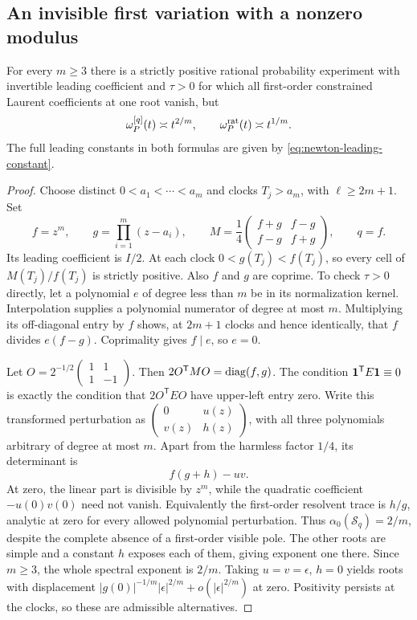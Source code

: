 \subsection{An invisible first variation with a nonzero modulus}
\begin{proposition}\label{prop:quadratic-exposure}
For every $m\ge3$ there is a strictly positive rational probability
experiment with invertible leading coefficient and $\tau>0$ for which
all first-order constrained Laurent coefficients at one root vanish,
but
\[
 \omega_P^{[q]}(t)\asymp t^{2/m},\qquad
 \omega_P^{\rm rat}(t)\asymp t^{1/m}.
\]
The full leading constants in both formulas are given by
\eqref{eq:newton-leading-constant}.
\end{proposition}
\begin{proof}
Choose distinct $0<a_1<\cdots<a_m$ and clocks $T_j>a_m$,
with $\ell\ge2m+1$. Set
\[
 f=z^m,\qquad g=\prod_{i=1}^m(z-a_i),\qquad
 M=\frac14\begin{pmatrix}f+g&f-g\\f-g&f+g\end{pmatrix},
 \qquad q=f.
\]
Its leading coefficient is $I/2$. At each clock $0<g(T_j)<f(T_j)$,
so every cell of $M(T_j)/f(T_j)$ is strictly positive. Also $f$ and
$g$ are coprime. To check $\tau>0$ directly, let a polynomial $e$ of
degree less than $m$ be in its normalization kernel. Interpolation
supplies a polynomial numerator of degree at most $m$. Multiplying
its off-diagonal entry by $f$ shows, at $2m+1$ clocks and hence
identically, that $f$ divides $e(f-g)$. Coprimality gives $f\mid e$,
so $e=0$.

Let $O=2^{-1/2}\left(\begin{smallmatrix}1&1\\1&-1\end{smallmatrix}\right)$.
Then $2O^{\mathsf T}MO=\operatorname{diag}(f,g)$. The condition
$\mathbf 1^{\mathsf T}E\mathbf 1\equiv0$ is exactly the condition that
$2O^{\mathsf T}EO$ have upper-left entry zero. Write this transformed
perturbation as
$\left(\begin{smallmatrix}0&u(z)\\v(z)&h(z)\end{smallmatrix}\right)$,
with all three polynomials arbitrary of degree at most $m$.
Apart from the harmless factor $1/4$, its determinant is
\begin{equation}\label{eq:quadratic-exposure-determinant}
                        f(g+h)-uv.
\end{equation}
At zero, the linear part is divisible by $z^m$, while the quadratic
coefficient $-u(0)v(0)$ need not vanish. Equivalently the first-order
resolvent trace is $h/g$, analytic at zero for every allowed polynomial
perturbation. Thus $\alpha_0(\mathcal S_q)=2/m$, despite the complete
absence of a first-order visible pole. The other roots are simple
and a constant $h$ exposes each of them, giving exponent one there.
Since $m\ge3$, the whole spectral exponent is $2/m$.
Taking $u=v=\epsilon$, $h=0$ yields roots with displacement
$|g(0)|^{-1/m}|\epsilon|^{2/m}+o(|\epsilon|^{2/m})$ at zero.
Positivity persists at the clocks, so these are admissible alternatives.


\end{proof}
